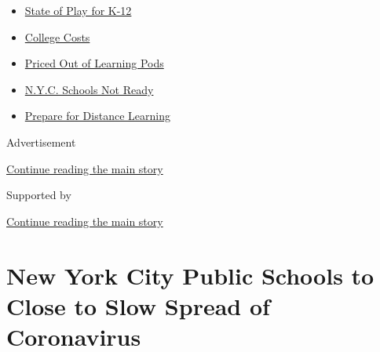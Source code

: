 \begin{itemize}
\tightlist
\item
  \href{https://www.nytimes.com/2020/08/17/us/k-12-schools-reopening.html?name=styln-coronavirus-schools-reopening\&region=TOP_BANNER\&variant=undefined\&block=storyline_menu_recirc\&action=click\&pgtype=Article\&impression_id=1f77e401-e0fd-11ea-8666-1b5a8ddc794b}{State
  of Play for K-12}
\item
  \href{https://www.nytimes.com/2020/08/15/us/covid-college-tuition.html?name=styln-coronavirus-schools-reopening\&region=TOP_BANNER\&variant=undefined\&block=storyline_menu_recirc\&action=click\&pgtype=Article\&impression_id=1f77e402-e0fd-11ea-8666-1b5a8ddc794b}{College
  Costs}
\item
  \href{https://www.nytimes.com/2020/08/14/us/covid-schools-learning-pods.html?name=styln-coronavirus-schools-reopening\&region=TOP_BANNER\&variant=undefined\&block=storyline_menu_recirc\&action=click\&pgtype=Article\&impression_id=1f780b10-e0fd-11ea-8666-1b5a8ddc794b}{Priced
  Out of Learning Pods}
\item
  \href{https://www.nytimes.com/2020/08/14/nyregion/school-reopening-nyc.html?name=styln-coronavirus-schools-reopening\&region=TOP_BANNER\&variant=undefined\&block=storyline_menu_recirc\&action=click\&pgtype=Article\&impression_id=1f780b11-e0fd-11ea-8666-1b5a8ddc794b}{N.Y.C.
  Schools Not Ready}
\item
  \href{https://www.nytimes.com/2020/08/05/parenting/parents-distance-learning.html?name=styln-coronavirus-schools-reopening\&region=TOP_BANNER\&variant=undefined\&block=storyline_menu_recirc\&action=click\&pgtype=Article\&impression_id=1f780b12-e0fd-11ea-8666-1b5a8ddc794b}{Prepare
  for Distance Learning}
\end{itemize}

Advertisement

\protect\hyperlink{after-top}{Continue reading the main story}

Supported by

\protect\hyperlink{after-sponsor}{Continue reading the main story}

\hypertarget{new-york-city-public-schools-to-close-to-slow-spread-of-coronavirus}{%
\section{New York City Public Schools to Close to Slow Spread of
Coronavirus}\label{new-york-city-public-schools-to-close-to-slow-spread-of-coronavirus}}

